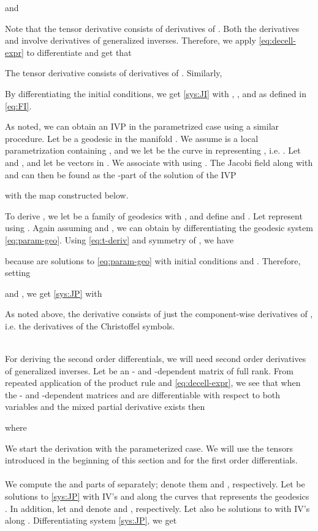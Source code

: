 \documentclass[final]{svjour3}
\begin{document}
    and
    
    Note that the tensor derivative 
    consists of derivatives of . Both the derivatives
     and 
     involve derivatives of generalized
    inverses. Therefore, we apply \eqref{eq:decell-expr} to differentiate 
    and get that
    
    The tensor derivative  consists of derivatives of .
    Similarly,
    
    By differentiating the initial conditions, we get
    \eqref{sys:JI} with , , and
     as defined in \eqref{eq:FI}.

As noted, we can obtain an IVP in the parametrized
case using a similar procedure. Let  be a geodesic in the  manifold . We assume 
 is a local parametrization containing , and
we let  be the curve in  representing , i.e. . 
Let  and , and let  be vectors in . We
associate  with  using .
The Jacobi field  along  with  and
 can then be found as the -part of the solution of the IVP
    
    with  the map constructed below.

    To derive , we let  be a family of geodesics with
    , and define
     and . Let  represent
     using .
    Again assuming  and ,
    we can obtain  by differentiating the 
    geodesic system \eqref{eq:param-geo}. Using \eqref{eq:t-deriv} and symmetry of
    , we have
    
    because  are solutions to \eqref{eq:param-geo} with initial conditions
     and . Therefore, setting 
    
    and 
    ,
    we get \eqref{sys:JP} with
    
    As noted above, the derivative  consists of 
    just the component-wise
    derivatives of , i.e. the derivatives of the Christoffel symbols.

\ \\
For deriving the second order differentials, we will 
need second order derivatives of generalized inverses.
Let  be an - and -dependent matrix of full rank.
From repeated application of the product rule and
\eqref{eq:decell-expr}, we see that 
when the - and -dependent matrices  and  are 
differentiable with respect to both variables
and the mixed partial derivative  exists then

where


We start the derivation with the parameterized
case. We will use the tensors introduced in the beginning of this section
and for the first order differentials.
\\\ \\
    We compute the  and 
    parts of  separately; denote them  and 
    , respectively. Let  be solutions to 
    \eqref{sys:JP} with IV's
     and along the curves  that represents the geodesics
    . In addition, let  and 
    denote  and , respectively. Let also  be
    solutions to  with IV's  along .
    Differentiating system \eqref{sys:JP}, we get
        
\end{document}
